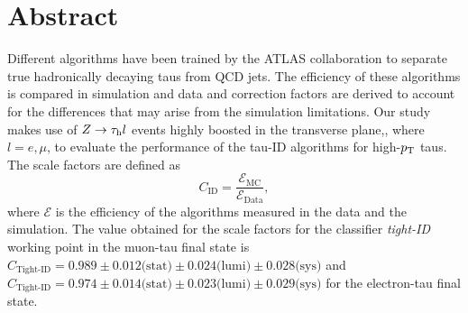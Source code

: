 \chapter*{Abstract}
Different algorithms have been trained by the ATLAS collaboration to separate true hadronically decaying taus from QCD jets. The efficiency of these algorithms is compared in simulation and data and correction factors are derived to account for the differences that may arise from the simulation limitations. Our study makes use of $Z\to\tau_\text{h} l$ events highly boosted in the transverse plane,, where $l=e,\mu$,  to evaluate the performance of the tau-ID algorithms for high-$p_\text{T}$ taus. The scale factors are defined as
\begin{equation}
	C_{\text{ID}}=\frac{\mathcal{E}_{\text{MC}}}{\mathcal{E}_{\text{Data}}},\nonumber
\end{equation}
where $\mathcal{E}$ is the efficiency of the algorithms measured in the data and the simulation. The value obtained for the scale factors for the classifier \textit{tight-ID} working point in the muon-tau final state is $C_{\text{Tight-ID}}=0.989\pm 0.012\text{(stat)}\pm 0.024\text{(lumi)}\pm 0.028\text{(sys)}$ and $C_{\text{Tight-ID}}=0.974\pm 0.014\text{(stat)}\pm 0.023\text{(lumi)}\pm 0.029\text{(sys)}$ for the electron-tau final state.


